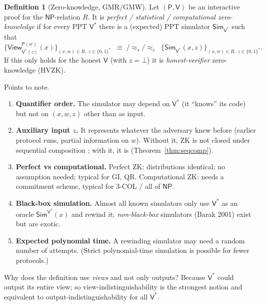 \documentclass[11pt,a4paper]{report}
\theoremstyle{plain}
\theoremstyle{definition}
\newtheorem{definition}[theorem]{Definition}
\theoremstyle{remark}
\newcommand{\PPT}{\mathrm{PPT}}
\newcommand{\Prv}{\mathsf{P}}\newcommand{\Ver}{\mathsf{V}}
\newcommand{\Sim}{\mathsf{Sim}}\newcommand{\Ext}{\mathsf{Ext}}
\newcommand{\view}{\mathsf{View}}
\newcommand{\NP}{\mathsf{NP}}\newcommand{\BPP}{\mathsf{BPP}}\newcommand{\IP}{\mathsf{IP}}
\begin{document}
\begin{definition}[Zero-knowledge, GMR/GMW]\label{def:zk}
Let $(\Prv,\Ver)$ be an interactive proof for the $\NP$-relation $R$. It is
\emph{perfect / statistical / computational zero-knowledge} if for every $\PPT$ $\Ver^*$ there is a (expected) $\PPT$ simulator $\Sim_{\Ver^*}$ such that
\[
\Big\{\view^{\Prv(w)}_{\Ver^*(z)}(x)\Big\}_{(x,w)\in R,\;z\in\{0,1\}^*}\;\;\equiv\;/\approx_s/\approx_c\;\;\Big\{\Sim_{\Ver^*}(x,z)\Big\}_{(x,w)\in R,\;z\in\{0,1\}^*}.
\]
If this only holds for the honest $\Ver$ (with $z=\bot$) it is \emph{honest-verifier} zero-knowledge (HVZK).
\end{definition}
Points to note.
\begin{enumerate}[label=(\alph*)]
\item \textbf{Quantifier order.} The simulator may depend on $\Ver^*$ (it ``knows'' its code) but not on $(x,w,z)$ other than as input.
\item \textbf{Auxiliary input $z$.} It represents whatever the adversary knew before (earlier protocol runs, partial information on $w$). Without it, ZK is not closed under sequential composition \cite{GO94}; with it, it is (Theorem~\ref{thm:seqcomp}).
\item \textbf{Perfect vs computational.} Perfect ZK: distributions identical; no assumption needed; typical for GI, QR. Computational ZK: needs a commitment scheme, typical for 3-COL / all of $\NP$.
\item \textbf{Black-box simulation.} Almost all known simulators only use $\Ver^*$ as an oracle $\Sim^{\Ver^*}(x)$ and rewind it; \emph{non-black-box} simulators (Barak 2001) exist but are exotic.
\item \textbf{Expected polynomial time.} A rewinding simulator may need a random number of attempts. (Strict polynomial-time simulation is possible for fewer protocols.)
\end{enumerate}

\begin{intuition}
Why does the definition use \emph{views} and not only outputs? Because $\Ver^*$ could output its entire view; so view-indistinguishability is the strongest notion and equivalent to output-indistinguishability for all $\Ver^*$.
\end{intuition}
\end{document}
